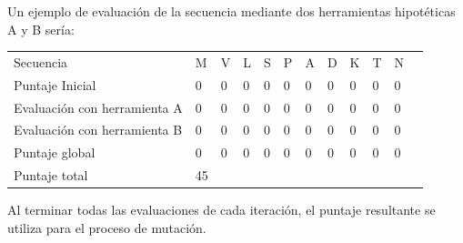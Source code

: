Un ejemplo de evaluación de la secuencia mediante dos herramientas hipotéticas A y B sería: %
\rule[-0.7\baselineskip]{0pt}{\baselineskip}
\begin{tabular}{llllllllllll} 
Secuencia & M & V & L & S & P & A & D & K & T & N\\ 
Puntaje Inicial & 0 & 0 & 0 & 0 & 0 & 0 & 0 & 0 & 0 & 0\\
Evaluación con herramienta A & 0 & 0 & 0 & 0 & 0 & 0 & 0 & 0 & 0 & 0\\
Evaluación con herramienta B  & 0 & 0 & 0 & 0 & 0 & 0 & 0 & 0 & 0 & 0\\
Puntaje global & 0 & 0 & 0 & 0 & 0 & 0 & 0 & 0 & 0 & 0\\
Puntaje total  & 45 \\
\end{tabular}

\vspace{0.5cm}

Al terminar todas las evaluaciones de cada iteración, el puntaje resultante se utiliza para el proceso de mutación.


